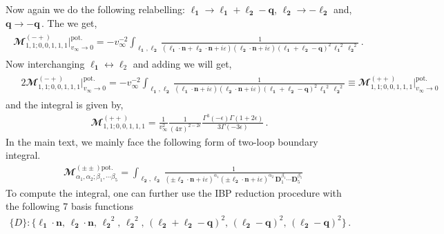 Now again we do the following relabelling: $\boldsymbol{\ell_1}\to \boldsymbol{\ell_1}+\boldsymbol{\ell_2}-\boldsymbol{q}$, $\boldsymbol{\ell_2}\to -\boldsymbol{\ell_2}$ and, ${\boldsymbol{q}\to -\boldsymbol{q}}\,.$ The we get,
\begin{align}
    \begin{split}
        \mathbfcal{M}_{1,1;0,0,1,1,1}^{(-+)}\Big|_{v_{\infty}\to 0}^{\textrm{pot.}}=-v_\infty^{-2}\int_{\boldsymbol{\ell_1},\boldsymbol{\ell_2}}\frac{1}{(\boldsymbol{\ell_1}\cdot \boldsymbol{n}+\boldsymbol{\ell_2}\cdot \boldsymbol{n}+i\varepsilon)(\boldsymbol{\ell_2}\cdot \boldsymbol{n}+i\varepsilon)(\boldsymbol{\ell_1}+\boldsymbol{\ell_2}-\boldsymbol{q})^2\,\boldsymbol{\ell_1}^2\,\boldsymbol{\ell_2}^2}\,.
    \end{split}
\end{align}
Now interchanging $\boldsymbol{\ell_{1}}\leftrightarrow \boldsymbol{\ell}_2$ and adding we will get,
\begin{align}
    \begin{split}
        & 2\mathbfcal{M}_{1,1;0,0,1,1,1}^{(-+)}\Big|_{v_{\infty}\to 0}^{\textrm{pot.}}=-v_\infty^{-2}\int_{\boldsymbol{\ell_{1},\ell_{2}}}\frac{1}{(\boldsymbol{\ell_1}\cdot \boldsymbol{n}+i\varepsilon)(\boldsymbol{\ell_2}\cdot \boldsymbol{n}+i\varepsilon)(\boldsymbol{\ell_1}+\boldsymbol{\ell_2}-\boldsymbol{q})^2\,\boldsymbol{\ell_1}^2\,\boldsymbol{\ell_2}^2}\equiv\mathbfcal{M}_{1,1;0,0,1,1,1}^{(++)}\Big|_{v_{\infty}\to 0}^{\textrm{pot.}}\,
    \end{split}
\end{align}
and the integral is given by,
\begin{align}
    \mathbfcal{M}^{(++)}_{1,1;0,0,1,1,1}=\frac{1}{v_\infty^2}\frac{1}{(4\pi)^{2-2\epsilon}}\frac{\Gamma^3(-\epsilon)\Gamma(1+2\epsilon)}{3\Gamma(-3\epsilon)}\,.
\end{align}
In the main text, we mainly face the following form of two-loop boundary integral.
\begin{align}
    &\mathbfcal{M}^{(\pm\pm)\textrm{pot.}}_{\alpha_1,\alpha_2;\beta_1,\cdots \beta_5}=\int_{\boldsymbol{\ell_2},\boldsymbol{\ell_2}}\frac{1}{(\pm \boldsymbol{\ell_2}\cdot \boldsymbol{n}+i\varepsilon)^{\alpha_1}(\pm \boldsymbol{\ell_2}\cdot \boldsymbol{n}+i\varepsilon)^{\alpha_2}\,\boldsymbol{D}_1^{\beta_1}\cdots \boldsymbol{D}_5^{\beta_5}}
\end{align}
To compute the integral, one can further use the IBP reduction procedure with the following 7 basis functions
\begin{align}
    \{D\}: \{\boldsymbol{\ell_1}\cdot \boldsymbol{n},\,\boldsymbol{\ell_2}\cdot \boldsymbol{n},\,\boldsymbol{\ell_2}^2,\,\boldsymbol{\ell_2}^2,\,(\boldsymbol{\ell_2}+\boldsymbol{\ell_2}-\boldsymbol{q})^2,\,(\boldsymbol{\ell_2}-\boldsymbol{q})^2,\,(\boldsymbol{\ell_2}-\boldsymbol{q})^2\}\,.
\end{align}
